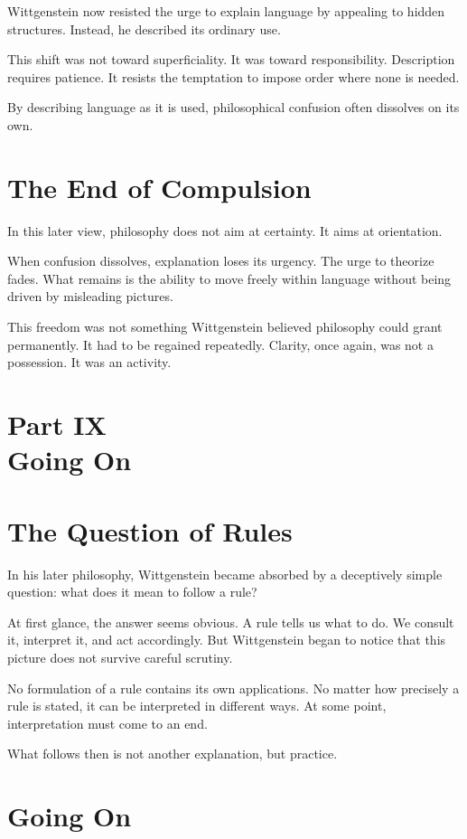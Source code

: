 \documentclass[11pt]{article}
\begin{document}
Wittgenstein now resisted the urge to explain language by appealing to hidden structures. Instead, he described its ordinary use.

This shift was not toward superficiality. It was toward responsibility. Description requires patience. It resists the temptation to impose order where none is needed.

By describing language as it is used, philosophical confusion often dissolves on its own.

\section*{The End of Compulsion}

In this later view, philosophy does not aim at certainty. It aims at orientation.

When confusion dissolves, explanation loses its urgency. The urge to theorize fades. What remains is the ability to move freely within language without being driven by misleading pictures.

This freedom was not something Wittgenstein believed philosophy could grant permanently. It had to be regained repeatedly. Clarity, once again, was not a possession. It was an activity.

\newpage
\section*{Part IX \\ Going On}

\section*{The Question of Rules}

In his later philosophy, Wittgenstein became absorbed by a deceptively simple question: what does it mean to follow a rule?

At first glance, the answer seems obvious. A rule tells us what to do. We consult it, interpret it, and act accordingly. But Wittgenstein began to notice that this picture does not survive careful scrutiny.

No formulation of a rule contains its own applications. No matter how precisely a rule is stated, it can be interpreted in different ways. At some point, interpretation must come to an end.

What follows then is not another explanation, but practice.

\section*{Going On}
\end{document}
